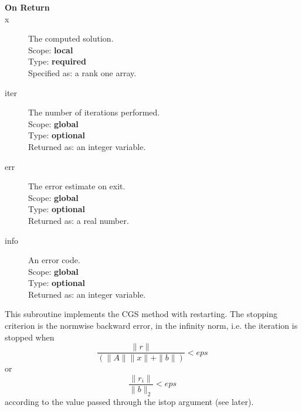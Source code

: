 \begin{description}
\item[\bf On Return] 
\item[x] The computed solution. \\
Scope: {\bf local} \\
Type: {\bf required}\\
Specified as: a rank one array.
\item[iter]  The number of iterations performed.\\
Scope: {\bf global} \\
Type: {\bf optional}\\
Returned  as: an integer variable.
\item[err]  The error estimate on exit.\\
Scope: {\bf global} \\
Type: {\bf optional}\\
Returned  as: a real number.
\item[info]  An error code.\\
Scope: {\bf global} \\
Type: {\bf optional}\\
Returned  as: an integer variable.
\end{description}
%
%


This subroutine implements the CGS method with restarting. The
stopping criterion is the normwise backward error, in the infinity
norm, i.e. the iteration is stopped when 
\[ \frac{\|r\|}{(\|A\|\|x\|+\|b\|)} < eps \]
or
\[ \frac{\|r_i\|}{\|b\|_2} < eps \]
according to the value passed through the  istop argument (see later).



